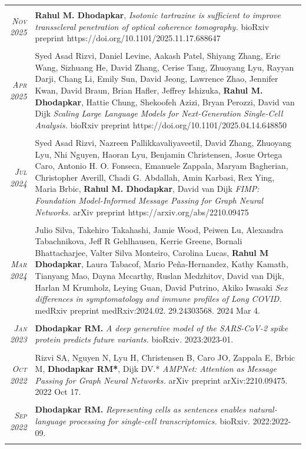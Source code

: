 \documentclass[a4paper,10pt]{article}
\begin{document}
\begin{tabular}{rp{11cm}}
 \multicolumn{2}{c}{} \\
 \textit{\textsc{Nov} 2025}& {\bf Rahul M. Dhodapkar}, {\it Isotonic tartrazine is sufficient to improve transscleral penetration of optical coherence tomography.} bioRxiv preprint https://doi.org/10.1101/2025.11.17.688647
 \\
 \multicolumn{2}{c}{} \\
 \textit{\textsc{Apr} 2025}&  Syed Asad Rizvi, Daniel Levine, Aakash Patel, Shiyang Zhang, Eric Wang, Sizhuang He, David Zhang, Cerise Tang, Zhuoyang Lyu, Rayyan Darji, Chang Li, Emily Sun, David Jeong, Lawrence Zhao, Jennifer Kwan, David Braun, Brian Hafler, Jeffrey Ishizuka, {\bf Rahul M. Dhodapkar}, Hattie Chung, Shekoofeh Azizi, Bryan Perozzi, David van Dijk {\it Scaling Large Language Models for Next-Generation Single-Cell Analysis.} bioRxiv preprint https://doi.org/10.1101/2025.04.14.648850
 \\
\multicolumn{2}{c}{} \\
 \textit{\textsc{Jul} 2024}& Syed Asad Rizvi, Nazreen Pallikkavaliyaveetil, David Zhang, Zhuoyang Lyu, Nhi Nguyen, Haoran Lyu, Benjamin Christensen, Josue Ortega Caro, Antonio H. O. Fonseca, Emanuele Zappala, Maryam Bagherian, Christopher Averill, Chadi G. Abdallah, Amin Karbasi, Rex Ying, Maria Brbic, {\bf Rahul M. Dhodapkar}, David van Dijk {\it FIMP: Foundation Model-Informed Message Passing for Graph Neural Networks.} arXiv preprint https://arxiv.org/abs/2210.09475
 \\
\multicolumn{2}{c}{} \\
 \textit{\textsc{Mar} 2024}& Julio Silva, Takehiro Takahashi, Jamie Wood, Peiwen Lu, Alexandra Tabachnikova, Jeff R Gehlhausen, Kerrie Greene, Bornali Bhattacharjee, Valter Silva Monteiro, Carolina Lucas, \textbf{Rahul M Dhodapkar}, Laura Tabacof, Mario Peña-Hernandez, Kathy Kamath, Tianyang Mao, Dayna Mccarthy, Ruslan Medzhitov, David van Dijk, Harlan M Krumholz, Leying Guan, David Putrino, Akiko Iwasaki {\it Sex differences in symptomatology and immune profiles of Long COVID.} medRxiv preprint medRxiv:2024.02. 29.24303568. 2024 Mar 4.
 \\
\multicolumn{2}{c}{} \\
 \textit{\textsc{Jan} 2023}& {\bf Dhodapkar RM.} {\it A deep generative model of the SARS-CoV-2 spike protein predicts future variants.} bioRxiv. 2023:2023-01. \\
\multicolumn{2}{c}{} \\
 \textit{\textsc{Oct} 2022}& Rizvi SA, Nguyen N, Lyu H, Christensen B, Caro JO, Zappala E, Brbic M, {\bf Dhodapkar RM*}, Dijk DV.* {\it AMPNet: Attention as Message Passing for Graph Neural Networks.} arXiv preprint arXiv:2210.09475. 2022 Oct 17.
 \\
\multicolumn{2}{c}{} \\
 \textit{\textsc{Sep} 2022}& {\bf Dhodapkar RM.} {\it Representing cells as sentences enables natural-language processing for single-cell transcriptomics.} bioRxiv. 2022:2022-09.
 \\
\multicolumn{2}{c}{}
\end{tabular}
\end{document}
